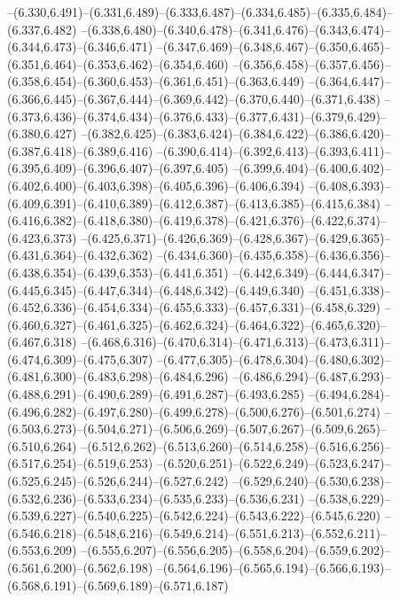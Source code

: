   --(6.330,6.491)--(6.331,6.489)--(6.333,6.487)--(6.334,6.485)--(6.335,6.484)--(6.337,6.482)%
  --(6.338,6.480)--(6.340,6.478)--(6.341,6.476)--(6.343,6.474)--(6.344,6.473)--(6.346,6.471)%
  --(6.347,6.469)--(6.348,6.467)--(6.350,6.465)--(6.351,6.464)--(6.353,6.462)--(6.354,6.460)%
  --(6.356,6.458)--(6.357,6.456)--(6.358,6.454)--(6.360,6.453)--(6.361,6.451)--(6.363,6.449)%
  --(6.364,6.447)--(6.366,6.445)--(6.367,6.444)--(6.369,6.442)--(6.370,6.440)--(6.371,6.438)%
  --(6.373,6.436)--(6.374,6.434)--(6.376,6.433)--(6.377,6.431)--(6.379,6.429)--(6.380,6.427)%
  --(6.382,6.425)--(6.383,6.424)--(6.384,6.422)--(6.386,6.420)--(6.387,6.418)--(6.389,6.416)%
  --(6.390,6.414)--(6.392,6.413)--(6.393,6.411)--(6.395,6.409)--(6.396,6.407)--(6.397,6.405)%
  --(6.399,6.404)--(6.400,6.402)--(6.402,6.400)--(6.403,6.398)--(6.405,6.396)--(6.406,6.394)%
  --(6.408,6.393)--(6.409,6.391)--(6.410,6.389)--(6.412,6.387)--(6.413,6.385)--(6.415,6.384)%
  --(6.416,6.382)--(6.418,6.380)--(6.419,6.378)--(6.421,6.376)--(6.422,6.374)--(6.423,6.373)%
  --(6.425,6.371)--(6.426,6.369)--(6.428,6.367)--(6.429,6.365)--(6.431,6.364)--(6.432,6.362)%
  --(6.434,6.360)--(6.435,6.358)--(6.436,6.356)--(6.438,6.354)--(6.439,6.353)--(6.441,6.351)%
  --(6.442,6.349)--(6.444,6.347)--(6.445,6.345)--(6.447,6.344)--(6.448,6.342)--(6.449,6.340)%
  --(6.451,6.338)--(6.452,6.336)--(6.454,6.334)--(6.455,6.333)--(6.457,6.331)--(6.458,6.329)%
  --(6.460,6.327)--(6.461,6.325)--(6.462,6.324)--(6.464,6.322)--(6.465,6.320)--(6.467,6.318)%
  --(6.468,6.316)--(6.470,6.314)--(6.471,6.313)--(6.473,6.311)--(6.474,6.309)--(6.475,6.307)%
  --(6.477,6.305)--(6.478,6.304)--(6.480,6.302)--(6.481,6.300)--(6.483,6.298)--(6.484,6.296)%
  --(6.486,6.294)--(6.487,6.293)--(6.488,6.291)--(6.490,6.289)--(6.491,6.287)--(6.493,6.285)%
  --(6.494,6.284)--(6.496,6.282)--(6.497,6.280)--(6.499,6.278)--(6.500,6.276)--(6.501,6.274)%
  --(6.503,6.273)--(6.504,6.271)--(6.506,6.269)--(6.507,6.267)--(6.509,6.265)--(6.510,6.264)%
  --(6.512,6.262)--(6.513,6.260)--(6.514,6.258)--(6.516,6.256)--(6.517,6.254)--(6.519,6.253)%
  --(6.520,6.251)--(6.522,6.249)--(6.523,6.247)--(6.525,6.245)--(6.526,6.244)--(6.527,6.242)%
  --(6.529,6.240)--(6.530,6.238)--(6.532,6.236)--(6.533,6.234)--(6.535,6.233)--(6.536,6.231)%
  --(6.538,6.229)--(6.539,6.227)--(6.540,6.225)--(6.542,6.224)--(6.543,6.222)--(6.545,6.220)%
  --(6.546,6.218)--(6.548,6.216)--(6.549,6.214)--(6.551,6.213)--(6.552,6.211)--(6.553,6.209)%
  --(6.555,6.207)--(6.556,6.205)--(6.558,6.204)--(6.559,6.202)--(6.561,6.200)--(6.562,6.198)%
  --(6.564,6.196)--(6.565,6.194)--(6.566,6.193)--(6.568,6.191)--(6.569,6.189)--(6.571,6.187)%

